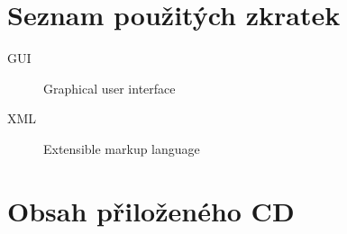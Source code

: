 \chapter{Seznam použitých zkratek}
\begin{description}
	\item[GUI] Graphical user interface
	\item[XML] Extensible markup language
\end{description}


\chapter{Obsah přiloženého CD}